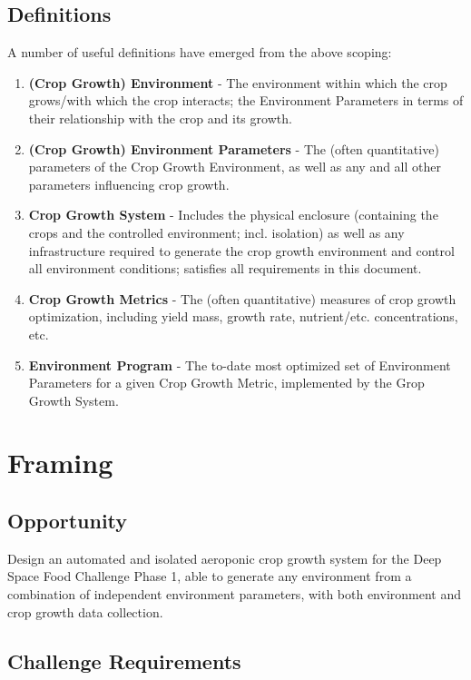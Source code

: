 \documentclass{report}
\begin{document}
\newpage
\subsection{Definitions}
\label{sec:definitions}

A number of useful definitions have emerged from the above scoping:
\begin{enumerate}
\item \textbf{(Crop Growth) Environment} - The environment within which the crop grows/with which the crop interacts; the Environment Parameters in terms of their relationship with the crop and its growth.
\item \textbf{(Crop Growth) Environment Parameters} - The (often quantitative) parameters of the Crop Growth Environment, as well as any and all other parameters influencing crop growth.
\item \textbf{Crop Growth System} - Includes the physical enclosure (containing the crops and the controlled environment; incl. isolation) as well as any infrastructure required to generate the crop growth environment and control all environment conditions; satisfies all requirements in this document.
\item \textbf{Crop Growth Metrics} - The (often quantitative) measures of crop growth optimization, including yield mass, growth rate, nutrient/etc. concentrations, etc.
\item \textbf{Environment Program} - The to-date most optimized set of Environment Parameters for a given Crop Growth Metric, implemented by the Grop Growth System.
\end{enumerate}

\newpage
\section{Framing}
\label{sec:framing}

\subsection{Opportunity}
\label{sec:opportunity}

Design an automated and isolated aeroponic crop growth system for the Deep Space Food Challenge Phase 1\cite{dsfc}, able to generate any environment from a combination of independent environment parameters, with both environment and crop growth data collection.

\subsection{Challenge Requirements}
\label{sec:requirements}
\end{document}
